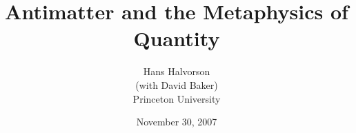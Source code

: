 \documentclass{beamer}
\title{Antimatter and the Metaphysics of Quantity}
\author{Hans Halvorson \\ (with David Baker) \\
  {\small Princeton University}}
\date{November 30, 2007}
\begin{document}
\begin{frame}
\titlepage
\end{frame}













\end{document}
